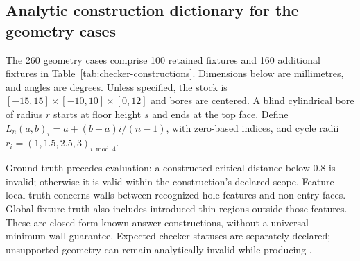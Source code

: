 \subsection{Analytic construction dictionary for the geometry cases}
The 260 geometry cases comprise 100 retained fixtures and 160 additional fixtures in Table~\ref{tab:checker-constructions}. Dimensions below are millimetres, and angles are degrees. Unless specified, the stock is $[-15,15]\times[-10,10]\times[0,12]$ and bores are centered. A blind cylindrical bore of radius $r$ starts at floor height $s$ and ends at the top face. Define $L_n(a,b)_i=a+(b-a)i/(n-1)$, with zero-based indices, and cycle radii $r_i=(1,1.5,2.5,3)_{i\bmod4}$.

Ground truth precedes evaluation: a constructed critical distance below 0.8 is invalid; otherwise it is valid within the construction's declared scope. Feature-local truth concerns walls between recognized hole features and non-entry faces. Global fixture truth also includes introduced thin regions outside those features. These are closed-form known-answer constructions, without a universal minimum-wall guarantee. Expected checker statuses are separately declared; unsupported geometry can remain analytically invalid while producing .

